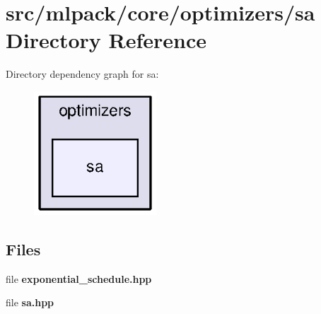 \section{src/mlpack/core/optimizers/sa Directory Reference}
\label{dir_9f40f51d8aaee01cc4bb84882cf8b376}
Directory dependency graph for sa\+:
\nopagebreak
\begin{figure}[H]
\begin{center}
\leavevmode
\includegraphics[width=130pt]{dir_9f40f51d8aaee01cc4bb84882cf8b376_dep}
\end{center}
\end{figure}
\subsection*{Files}
\begin{DoxyCompactItemize}
\item 
file {\bf exponential\+\_\+schedule.\+hpp}
\item 
file {\bf sa.\+hpp}
\end{DoxyCompactItemize}
